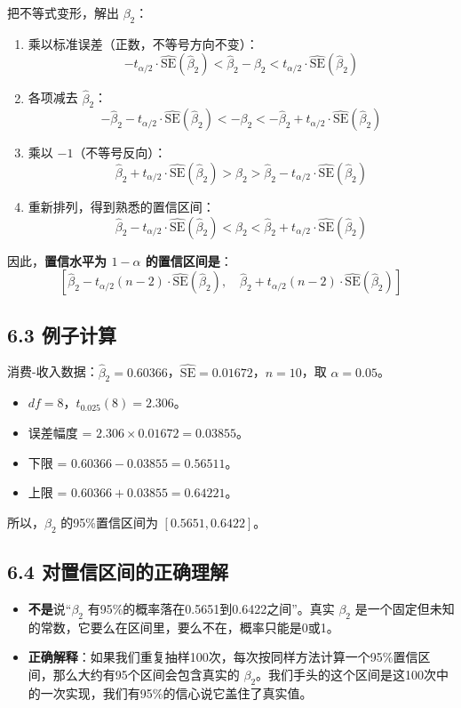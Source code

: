 \documentclass[12pt,a4paper]{ctexart}
\begin{document}
把不等式变形，解出 \(\beta_2\)：
\begin{enumerate}
    \item 乘以标准误差（正数，不等号方向不变）：
    \[
    -t_{\alpha/2} \cdot \widehat{\text{SE}}(\hat{\beta}_2) < \hat{\beta}_2 - \beta_2 < t_{\alpha/2} \cdot \widehat{\text{SE}}(\hat{\beta}_2)
    \]
    \item 各项减去 \(\hat{\beta}_2\)：
    \[
    -\hat{\beta}_2 - t_{\alpha/2} \cdot \widehat{\text{SE}}(\hat{\beta}_2) < -\beta_2 < -\hat{\beta}_2 + t_{\alpha/2} \cdot \widehat{\text{SE}}(\hat{\beta}_2)
    \]
    \item 乘以 \(-1\)（不等号反向）：
    \[
    \hat{\beta}_2 + t_{\alpha/2} \cdot \widehat{\text{SE}}(\hat{\beta}_2) > \beta_2 > \hat{\beta}_2 - t_{\alpha/2} \cdot \widehat{\text{SE}}(\hat{\beta}_2)
    \]
    \item 重新排列，得到熟悉的置信区间：
    \[
    \hat{\beta}_2 - t_{\alpha/2} \cdot \widehat{\text{SE}}(\hat{\beta}_2) < \beta_2 < \hat{\beta}_2 + t_{\alpha/2} \cdot \widehat{\text{SE}}(\hat{\beta}_2)
    \]
\end{enumerate}

因此，\textbf{置信水平为 \(1-\alpha\) 的置信区间是}：
\[
\left[ \hat{\beta}_2 - t_{\alpha/2}(n-2) \cdot \widehat{\text{SE}}(\hat{\beta}_2),\quad \hat{\beta}_2 + t_{\alpha/2}(n-2) \cdot \widehat{\text{SE}}(\hat{\beta}_2) \right]
\]

\subsection*{6.3 例子计算}
消费-收入数据：\(\hat{\beta}_2 = 0.60366\)，\(\widehat{\text{SE}} = 0.01672\)，\(n=10\)，取 \(\alpha=0.05\)。
\begin{itemize}
    \item \(df = 8\)，\(t_{0.025}(8) = 2.306\)。
    \item 误差幅度 = \(2.306 \times 0.01672 = 0.03855\)。
    \item 下限 = \(0.60366 - 0.03855 = 0.56511\)。
    \item 上限 = \(0.60366 + 0.03855 = 0.64221\)。
\end{itemize}
所以，\(\beta_2\) 的95\%置信区间为 \([0.5651, 0.6422]\)。

\subsection*{6.4 对置信区间的正确理解}
\begin{itemize}
    \item \textbf{不是}说“\(\beta_2\) 有95\%的概率落在0.5651到0.6422之间”。真实 \(\beta_2\) 是一个固定但未知的常数，它要么在区间里，要么不在，概率只能是0或1。
    \item \textbf{正确解释}：如果我们重复抽样100次，每次按同样方法计算一个95\%置信区间，那么大约有95个区间会包含真实的 \(\beta_2\)。我们手头的这个区间是这100次中的一次实现，我们有95\%的信心说它盖住了真实值。
\end{itemize}
\end{document}
